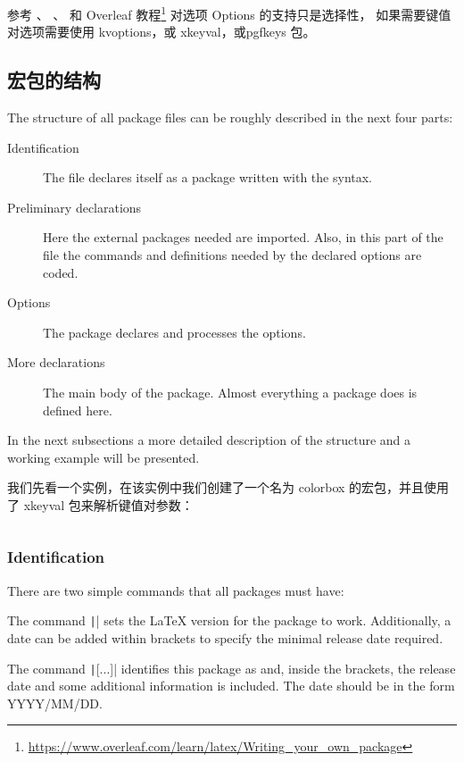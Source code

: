 参考 \cite{CLSGUIDE}、\cite{WIKIBOOKS} 、\cite{COMPANION} 和 Overleaf 教程\footnote{\url{https://www.overleaf.com/learn/latex/Writing_your_own_package}}
{\LaTeXe} 对选项 Options 的支持只是选择性， 如果需要键值对选项需要使用 kvoptions，或 xkeyval，或pgfkeys 包。

\subsection{宏包的结构}

The structure of all package files can be roughly described in the next four parts:

\begin{description}
  \item[Identification] The file declares itself as a package written with the {\LaTeXe} syntax.
  \item[Preliminary declarations] Here the external packages needed are imported. Also, in this part of the file the commands and definitions needed by the declared options are coded.
  \item[Options] The package declares and processes the options.
  \item[More declarations] The main body of the package. Almost everything a package does is defined here.
\end{description}

In the next subsections a more detailed description of the structure and a working example will be presented.

我们先看一个实例，在该实例中我们创建了一个名为 colorbox 的宏包，并且使用了 xkeyval 包来解析键值对参数：

\inputminted{latex}{../examples/programming/create-packages.tex}

\subsubsection{Identification}

There are two simple commands that all packages must have:

The command \texttt|| sets the {\LaTeX} version for the package to work. 
Additionally, a date can be added within brackets to specify the minimal release date required.

The command \texttt|[...]| identifies this package as 
 and, inside the brackets, the release date and some additional information 
is included. The date should be in the form YYYY/MM/DD.

